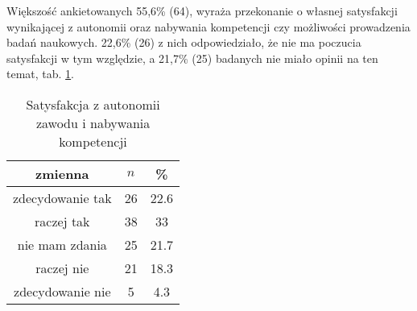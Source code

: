 

Większość ankietowanych 55,6\% (64), wyraża przekonanie o własnej satysfakcji wynikającej z autonomii oraz nabywania kompetencji czy możliwości prowadzenia badań naukowych. 22,6\% (26) z nich odpowiedziało, że nie ma poczucia satysfakcji w tym względzie, a 21,7\% (25) badanych nie miało opinii na ten temat, tab. \ref{tab:Q20}.



\begin{table}[H]
\caption{Satysfakcja z autonomii zawodu i nabywania kompetencji}
\centering
\begin{tabular}{ | c | c | c |}
\hline
zmienna & $n$ & \% \\
\hline
zdecydowanie tak  &  26  & 22.6 \\
\hline
raczej tak  &  38  & 33\\
\hline
nie mam zdania  &  25  & 21.7\\
\hline
raczej nie  &  21  & 18.3 \\
\hline
zdecydowanie nie  &  5  & 4.3\\
\hline
\end{tabular}
\label{tab:Q20}
\end{table}

